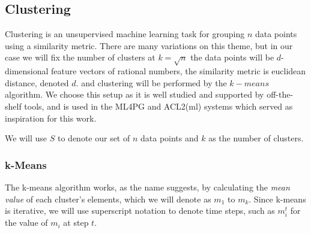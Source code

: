 \begin{figure}
  \centering

  \caption{}

  \label{fig:featureextractionpic}
\end{figure}

\subsection{Clustering}
\label{sec:clustering}

Clustering is an unsupervised machine learning task for grouping $n$ data points using a similarity metric. There are many variations on this theme, but in our case we will fix the number of clusters at \iffalse TODO: use ceiling brackets \fi $k = \sqrt{n}$ the data points will be $d$-dimensional feature vectors of rational numbers, the similarity metric is euclidean distance, denoted $d$. and clustering will be performed by the $k-means$ algorithm. We choose this setup as it is well studied and supported by off-the-shelf tools, and is used in the ML4PG and ACL2(ml) systems which served as inspiration for this work.

We will use $S$ to denote our set of $n$ data points and $k$ as the number of clusters.

\subsubsection{k-Means}

The k-means algorithm works, as the name suggests, by calculating the \emph{mean value} of each cluster's elements, which we will denote as $m_1$ to $m_k$. Since k-means is iterative, we will use superscript notation to denote time steps, such as $m_i^t$ for the value of $m_i$ at step $t$.

